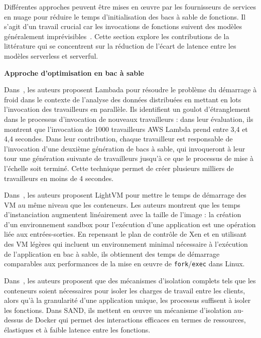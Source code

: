 Différentes approches peuvent être mises en œuvre par les fournisseurs de services en nuage pour réduire le temps d'initialisation des bacs à sable de fonctions. Il s'agit d'un travail crucial car les invocations de fonctions suivent des modèles généralement imprévisibles~\cite{shahradServerlessWildCharacterizing}. Cette section explore les contributions de la littérature qui se concentrent sur la réduction de l'écart de latence entre les modèles serverless et serverful.

\textbf{Approche d'optimisation en bac à sable}

Dans~\cite{mullerLambadaInteractiveData2020}, les auteurs proposent Lambada pour résoudre le problème du démarrage à froid dans le contexte de l'analyse des données distribuées en mettant en lots l'invocation des travailleurs en parallèle. Ils identifient un goulot d'étranglement dans le processus d'invocation de nouveaux travailleurs : dans leur évaluation, ils montrent que l'invocation de 1000 travailleurs AWS Lambda prend entre 3,4 et 4,4 secondes. Dans leur contribution, chaque travailleur est responsable de l'invocation d'une deuxième génération de bacs à sable, qui invoqueront à leur tour une génération suivante de travailleurs jusqu'à ce que le processus de mise à l'échelle soit terminé. Cette technique permet de créer plusieurs milliers de travailleurs en moins de 4 secondes.

Dans~\cite{mancoMyVMLighter2017}, les auteurs proposent LightVM pour mettre le temps de démarrage des VM au même niveau que les conteneurs. Les auteurs montrent que les temps d'instanciation augmentent linéairement avec la taille de l'image : la création d'un environnement sandbox pour l'exécution d'une application est une opération liée aux entrées-sorties. En repensant le plan de contrôle de Xen et en utilisant des VM légères qui incluent un environnement minimal nécessaire à l'exécution de l'application en bac à sable, ils obtiennent des temps de démarrage comparables aux performances de la mise en œuvre de \texttt{fork}/\texttt{exec} dans Linux.

Dans~\cite{akkusSANDHighPerformanceServerless}, les auteurs proposent que des mécanismes d'isolation complets tels que les conteneurs soient nécessaires pour isoler les charges de travail entre les clients, alors qu'à la granularité d'une application unique, les processus suffisent à isoler les fonctions. Dans SAND, ils mettent en œuvre un mécanisme d'isolation au-dessus de Docker qui permet des interactions efficaces en termes de ressources, élastiques et à faible latence entre les fonctions.

